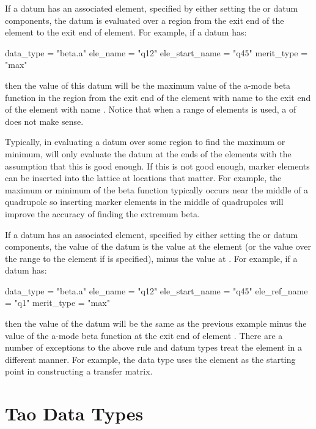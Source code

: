 If a datum has an associated  element, specified by either
setting the  or  datum components, the
datum is evaluated over a region from the exit end of the  element
to the exit end of  element. For example, if a datum has:
\begin{example}
  data_type      = "beta.a"
  ele_name       = "q12"
  ele_start_name = "q45"
  merit_type     = "max"
\end{example}
then the  value of this datum will be the maximum value of
the a-mode beta function in the region from the exit end of the
element with name  to the exit end of the element with name
. Notice that when a range of elements is used, a
 of  does not make sense. 

Typically, in evaluating a datum over some region to find the maximum
or minimum, \tao will only evaluate the datum at the ends of the
elements with the assumption that this is good enough. If this is not
good enough, marker elements can be inserted into the lattice at
locations that matter. For example, the maximum or minimum of the beta
function typically occurs near the middle of a quadrupole so inserting
marker elements in the middle of quadrupoles will improve the accuracy
of finding the extremum beta.

If a datum has an associated  element, specified by either
setting the  or  datum components, the
 value of the datum is the value at the  element (or the value
over the range  to the  element if  is
specified), minus the  value at . For example,
if a datum has:
\begin{example}
  data_type      = "beta.a"
  ele_name       = "q12"
  ele_start_name = "q45"
  ele_ref_name   = "q1"
  merit_type     = "max"
\end{example}
then the  value of the datum will be the same as the
previous example minus the value of the a-mode beta function at the
exit end of element . There are a number of exceptions to the
above rule and datum types treat the  element in a different
manner. For example, the  data type uses the  element
as the starting point in constructing a transfer matrix.

\section{Tao Data Types}
\label{s:data.types}


